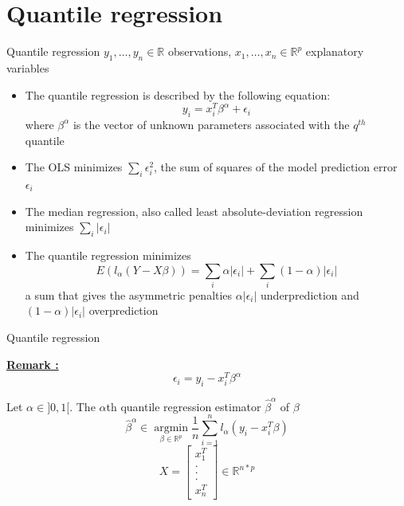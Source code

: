 \documentclass[unknownkeysallowed]{beamer}
\begin{document}
\section{Quantile regression}
\label{sec:Quantile regression}

\begin{frame}{Quantile regression}
$y_{1},\dots, y_{n}\in \mathbb{R}$ observations, $x_{1},\dots, x_{n}\in \mathbb{R}^p$ explanatory variables \\
\begin{itemize}
    \item The quantile regression is described by the following equation:
    $$y_i = x_i^T \beta^{\alpha} + \epsilon_i$$
    where $\beta^{\alpha}$ is the vector of unknown parameters associated with the $q^{th}$ quantile
    \item The OLS minimizes $\sum_i \epsilon_i^2$, the sum of squares of the model prediction error $\epsilon_i$
    \item The median regression, also called least absolute-deviation regression minimizes $\sum_i \left | \epsilon_i \right |$
    \item The quantile regression minimizes 
    $$ E(l _{\alpha }(Y-X\beta )) = \sum_i \alpha \left | \epsilon_i \right | + \sum_i (1 - \alpha) \left | \epsilon_i \right |$$
    a sum that gives the asymmetric penalties $  \alpha \left | \epsilon_i \right |$ underprediction and $(1 - \alpha) \left | \epsilon_i \right |$ overprediction
   
\end{itemize}   
\end{frame}





\begin{frame}{Quantile regression}


\underline{\textbf{Remark :}}
$$ \epsilon_i = y_i - x_i^T \beta^{\alpha}$$

{
Let $\alpha \in ]0,1[$. The $\alpha$th quantile regression estimator $\hat{\beta}^{\alpha}$ of $\beta$
$$\hat{\beta}^{\alpha}\in \operatorname*{argmin}_{\beta\in \mathds{R}^p}\dfrac{1}{n}\sum_{i=1}^{n}l_{\alpha}(y_{i}-x_{i}^T \beta)$$
$$X= \begin{bmatrix} x_{1}^T \\ .\\.\\.\\
x_{n}^T
\end{bmatrix} \in \mathds{R}^{n*p}$$
}

\vspace{0.25cm}
\end{frame}
\end{document}
